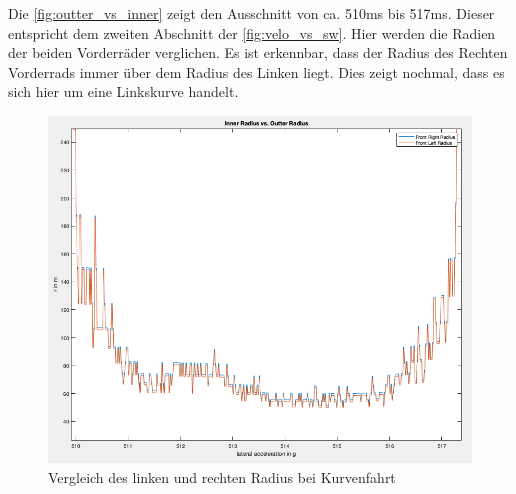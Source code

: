 \newpage
Die \autoref{fig:outter_vs_inner} zeigt den Ausschnitt von ca. 510ms bis 517ms. Dieser entspricht dem zweiten Abschnitt der \autoref{fig:velo_vs_sw}. Hier werden die Radien der beiden Vorderräder verglichen. Es ist erkennbar, dass der Radius des Rechten Vorderrads immer über dem Radius des Linken liegt. Dies zeigt nochmal, dass es sich hier um eine Linkskurve handelt.
\begin{figure}[h!]
	\centering
	\includegraphics[width=1\linewidth]{../Graphiken/outter_vs_inner}
	\caption{Vergleich des linken und rechten Radius bei Kurvenfahrt}
	\label{fig:outter_vs_inner}
\end{figure}
\cleardoublepage
\newpage



	
	

	
	
	
	